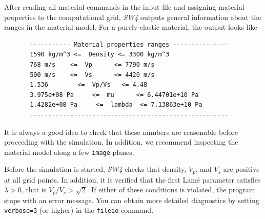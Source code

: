 \documentclass[11pt]{report}
\begin{document}
{%

After reading all material commands in the input file and assigning material properties to the
computational grid, \emph{SW4} outputs general information about the ranges in the material
model. For a purely elastic material, the output looks like
\newpage
\begin{verbatim}
       ----------- Material properties ranges ---------------
       1590 kg/m^3 <=  Density <= 3300 kg/m^3
       768 m/s    <=  Vp      <= 7790 m/s
       500 m/s    <=  Vs      <= 4420 m/s
       1.536        <=  Vp/Vs   <= 4.48
       3.975e+08 Pa     <=  mu      <= 6.44701e+10 Pa
       1.4282e+08 Pa     <=  lambda  <= 7.13863e+10 Pa
       ------------------------------------------------------
\end{verbatim}
It is always a good idea to check that these numbers are reasonable before proceeding with the
simulation. In addition, we recommend inspecting the material model along a few \verb+image+ planes.

Before the simulation is started, \emph{SW4} checks that density, $V_p$, and $V_s$ are
positive at all grid points. In addition, it is verified that the first Lam\'e parameter satisfies
$\lambda>0$, that is $V_p/V_s > \sqrt{2}$. If either of these conditions is violated, the program
stops with an error message. You can obtain more detailed diagnostics by setting \verb+verbose=3+
(or higher) in the \verb+fileio+ command.


}
\end{document}
